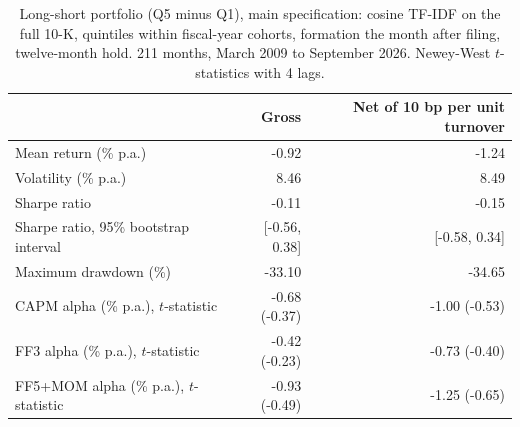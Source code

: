 \begin{table}[htbp]\centering\small
\caption{Long-short portfolio (Q5 minus Q1), main specification: cosine TF-IDF on the full 10-K, quintiles within fiscal-year cohorts, formation the month after filing, twelve-month hold. 211 months, March 2009 to September 2026. Newey-West $t$-statistics with 4 lags.}\label{tab:main}
\begin{tabular}{lrr}\toprule
 & Gross & Net of 10 bp per unit turnover \\ \midrule
Mean return (\% p.a.) & -0.92 & -1.24 \\
Volatility (\% p.a.) & 8.46 & 8.49 \\
Sharpe ratio & -0.11 & -0.15 \\
Sharpe ratio, 95\% bootstrap interval & [-0.56, 0.38] & [-0.58, 0.34] \\
Maximum drawdown (\%) & -33.10 & -34.65 \\
CAPM alpha (\% p.a.), $t$-statistic & -0.68 (-0.37) & -1.00 (-0.53) \\
FF3 alpha (\% p.a.), $t$-statistic & -0.42 (-0.23) & -0.73 (-0.40) \\
FF5+MOM alpha (\% p.a.), $t$-statistic & -0.93 (-0.49) & -1.25 (-0.65) \\
\bottomrule\end{tabular}\end{table}
